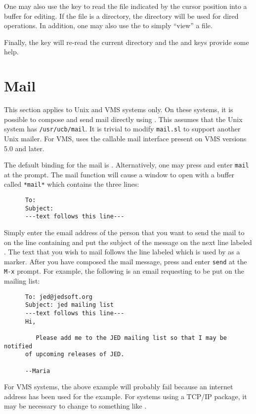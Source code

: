   One may also use the  key to read the file indicated by the cursor
  position into a buffer for editing.  If the file is a directory, the
  directory will be used for dired operations. In addition, one may also use
  the  to simply ``view'' a file.

  Finally, the  key will re-read the current directory and the
   and  keys provide some help.

\section{Mail}

  This section applies to Unix and VMS systems only.  On these systems, it
  is possible to compose and send mail directly using \jed{}.  This assumes
  that the Unix system has \verb|/usr/ucb/mail|.  It is trivial to modify
  \verb|mail.sl| to support another Unix mailer.  For VMS, \jed{} uses the
  callable mail interface present on VMS versions 5.0 and later.

  The default binding for the mail is .  Alternatively, one
  may press  and enter \verb|mail| at the  prompt.
  The mail function will cause a window to open with a buffer called
  \verb|*mail*| which contains the three lines:
\begin{verbatim}
      To: 
      Subject: 
      ---text follows this line---
\end{verbatim}
  Simply enter the email address of the person that you want to send the
  mail to on the line containing  and put the subject of the
  message on the next line labeled .  The text that you wish
  to mail follows the line labeled  which
  is used by \jed{} as a marker. After you have composed the mail message,
  press  and enter \verb|send| at the \verb|M-x| prompt.  For
  example, the following is an email requesting to be put on the \jed{} mailing
  list:

\begin{verbatim}
      To: jed@jedsoft.org
      Subject: jed mailing list
      ---text follows this line---
      Hi,
      
         Please add me to the JED mailing list so that I may be notified
      of upcoming releases of JED.

      --Maria
\end{verbatim}

  For VMS systems, the above example will probably fail because an internet
  address has been used for the example.  For systems using a TCP/IP
  package, it may be necessary to change  to
  something
  like .

